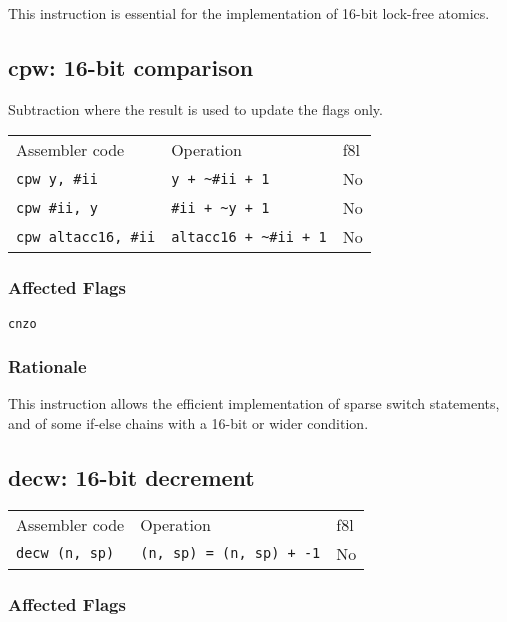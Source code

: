 \documentclass{book}
\begin{document}
This instruction is essential for the implementation of 16-bit lock-free atomics.


\subsection{cpw: 16-bit comparison}

Subtraction where the result is used to update the flags only.

\begin{tabular}{l l l}
Assembler code              & Operation                        & f8l\\
\texttt{cpw y, \#ii}        & \texttt{y + \~{}\#ii + 1}        & No \\
\texttt{cpw \#ii, y}        & \texttt{\#ii + \~{}y + 1}        & No \\
\texttt{cpw altacc16, \#ii} & \texttt{altacc16 + \~{}\#ii + 1} & No \\
\end{tabular}

\subsubsection*{Affected Flags}

\texttt{cnzo}

\subsubsection*{Rationale}

This instruction allows the efficient implementation of sparse switch statements, and of some if-else chains with a 16-bit or wider condition.


\subsection{decw: 16-bit decrement}

\begin{tabular}{l l l}
Assembler code        & Operation                       & f8l \\
\texttt{decw (n, sp)} & \texttt{(n, sp) = (n, sp) + -1} & No \\
\end{tabular}

\subsubsection*{Affected Flags}
\end{document}
